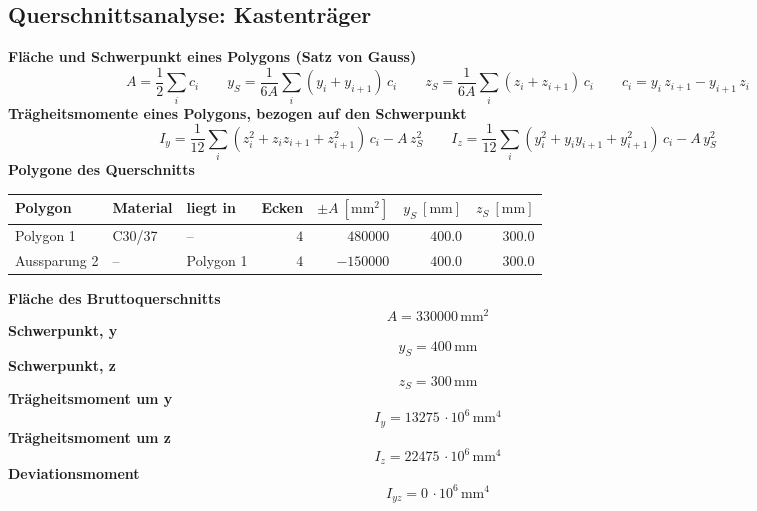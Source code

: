 \documentclass[11pt,a4paper]{article}
\begin{document}
\subsection{Querschnittsanalyse: Kastenträger}
\noindent\textbf{Fläche und Schwerpunkt eines Polygons (Satz von Gauss)}
\begin{equation*}
A = \frac{1}{2} \sum_i c_i \qquad y_S = \frac{1}{6A} \sum_i (y_i + y_{i+1})\, c_i \qquad z_S = \frac{1}{6A} \sum_i (z_i + z_{i+1})\, c_i \qquad c_i = y_i\, z_{i+1} - y_{i+1}\, z_i
\end{equation*}
\noindent\textbf{Trägheitsmomente eines Polygons, bezogen auf den Schwerpunkt}
\begin{equation*}
I_y = \frac{1}{12} \sum_i (z_i^2 + z_i z_{i+1} + z_{i+1}^2)\, c_i - A\, z_S^2\qquad I_z = \frac{1}{12} \sum_i (y_i^2 + y_i y_{i+1} + y_{i+1}^2)\, c_i - A\, y_S^2
\end{equation*}
\noindent\textbf{Polygone des Querschnitts}
\begin{longtable}{lllrrrr}
\hline
Polygon & Material & liegt in & Ecken & $\pm A\ [\mathrm{mm}^2]$ & $y_S\ [\mathrm{mm}]$ & $z_S\ [\mathrm{mm}]$ \\
\hline
\endhead
Polygon 1 & C30/37 & – & $4$ & $480000$ & $400.0$ & $300.0$ \\
Aussparung 2 & – & Polygon 1 & $4$ & $-150000$ & $400.0$ & $300.0$ \\
\hline
\end{longtable}
\noindent\textbf{Fläche des Bruttoquerschnitts}
\begin{equation*}
A = 330000\,\mathrm{mm}^{2}
\end{equation*}
\noindent\textbf{Schwerpunkt, y}
\begin{equation*}
y_S = 400\,\mathrm{mm}
\end{equation*}
\noindent\textbf{Schwerpunkt, z}
\begin{equation*}
z_S = 300\,\mathrm{mm}
\end{equation*}
\noindent\textbf{Trägheitsmoment um y}
\begin{equation*}
I_y = 13275\,\cdot 10^{6}\,\mathrm{mm}^{4}
\end{equation*}
\noindent\textbf{Trägheitsmoment um z}
\begin{equation*}
I_z = 22475\,\cdot 10^{6}\,\mathrm{mm}^{4}
\end{equation*}
\noindent\textbf{Deviationsmoment}
\begin{equation*}
I_{yz} = 0\,\cdot 10^{6}\,\mathrm{mm}^{4}
\end{equation*}
\end{document}
